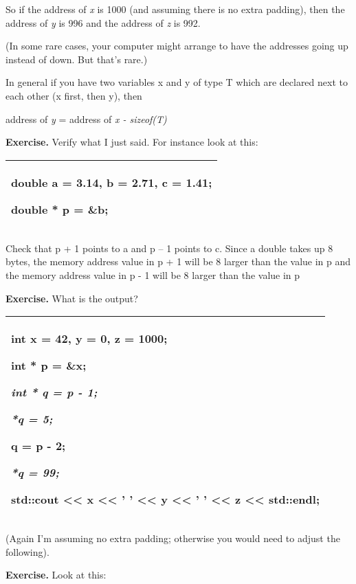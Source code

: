 \documentclass[
]{article}
\begin{document}
So if the address of \emph{x} is 1000 (and assuming there is no extra
padding), then the address of \emph{y} is 996 and the address of
\emph{z} is 992.

(In some rare cases, your computer might arrange to have the addresses
going up instead of down. But that's rare.)

In general if you have two variables x and y of type T which are
declared next to each other (x first, then y), then

address of \emph{y} = address of \emph{x - sizeof(T)}

\textbf{Exercise.} Verify what I just said. For instance look at this:

\begin{longtable}[]{@{}l@{}}
\toprule
\endhead
\begin{minipage}[t]{0.97\columnwidth}\raggedright
double a = 3.14, b = 2.71, c = 1.41;

double * p = \&b;\strut
\end{minipage}\tabularnewline
\bottomrule
\end{longtable}

Check that p + 1 points to a and p -- 1 points to c. Since a double
takes up 8 bytes, the memory address value in p + 1 will be 8 larger
than the value in p and the memory address value in p - 1 will be 8
larger than the value in p

\textbf{Exercise. }What is the output?

\begin{longtable}[]{@{}l@{}}
\toprule
\endhead
\begin{minipage}[t]{0.97\columnwidth}\raggedright
int x = 42, y = 0, z = 1000;

int * p = \&x;

\emph{int * q = p - 1;}

\emph{*q = 5;}

q = p - 2;

\emph{*q = 99;}

std::cout \textless\textless{} x \textless\textless{} ' '
\textless\textless{} y \textless\textless{} ' ' \textless\textless{} z
\textless\textless{} std::endl;\strut
\end{minipage}\tabularnewline
\bottomrule
\end{longtable}

(Again I'm assuming no extra padding; otherwise you would need to adjust
the following).

\textbf{Exercise.} Look at this:
\end{document}
